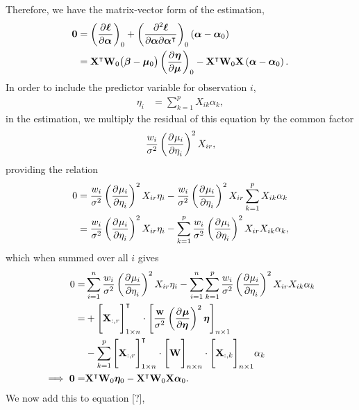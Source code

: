 Therefore, we have the matrix-vector form of the estimation,
\begin{align*}
  \mathbf{0} &= \left( \frac{\partial^{} \bm{\ell}}{\partial \bm{\alpha}^{} } \right)_0 + \left( \frac{\partial^2 \bm{\ell}}{\partial \bm{\alpha} \partial \bm{\alpha}^\intercal} \right)_0 \left( \bm{\alpha} - \bm{\alpha}_0 \right) \\
  &= \mathbf{X}^\intercal \mathbf{W}_0 \big(\bm{\beta} - \bm{\mu}_0\big) \left( \frac{\partial^{} \bm{\eta}}{\partial \bm{\mu}^{} } \right)_0 - \mathbf{X}^\intercal \mathbf{W}_0 \mathbf{X} \left( \bm{\alpha} - \bm{\alpha}_0 \right).
\end{align*}
In order to include the predictor variable for observation $i$,
\begin{align*}
  \eta_i &= \sum_{k=1}^p X_{ik} \alpha_k,
\end{align*}
in the estimation, we multiply the residual of this equation by the common factor
\begin{align*}
  \frac{w_i}{\sigma^2} \left( \frac{\partial^{} \mu_i}{\partial \eta_i^{} } \right)^2 X_{ir},
\end{align*}
providing the relation
\begin{align*}
  0 &= \frac{w_i}{\sigma^2} \left( \frac{\partial^{} \mu_i}{\partial \eta_i^{} } \right)^2 X_{ir} \eta_i - \frac{w_i}{\sigma^2} \left( \frac{\partial^{} \mu_i}{\partial \eta_i^{} } \right)^2 X_{ir} \sum_{k=1}^p X_{ik} \alpha_k \\
  &= \frac{w_i}{\sigma^2} \left( \frac{\partial^{} \mu_i}{\partial \eta_i^{} } \right)^2 X_{ir} \eta_i - \sum_{k=1}^p \frac{w_i}{\sigma^2} \left( \frac{\partial^{} \mu_i}{\partial \eta_i^{} } \right)^2 X_{ir} X_{ik} \alpha_k,
\end{align*}
which when summed over all $i$ gives
\begin{align*}
  0 = &\sum_{i=1}^n \frac{w_i}{\sigma^2} \left( \frac{\partial^{} \mu_i}{\partial \eta_i^{} } \right)^2 X_{ir} \eta_i - \sum_{i=1}^n \sum_{k=1}^p \frac{w_i}{\sigma^2} \left( \frac{\partial^{} \mu_i}{\partial \eta_i^{} } \right)^2 X_{ir} X_{ik} \alpha_k \\
  = &+ \Bigg[ \mathbf{X}_{:,r} \Bigg]_{1 \times n}^\intercal \cdot \Bigg[ \frac{\mathbf{w}}{\sigma^2} \left( \frac{\partial^{} \bm{\mu}}{\partial \bm{\eta}^{} } \right)^2 \bm{\eta} \Bigg]_{n \times 1} \\
    &- \sum_{k=1}^p \Bigg[ \mathbf{X}_{:,r} \Bigg]_{1 \times n}^\intercal \cdot \Bigg[ \mathbf{W} \Bigg]_{n \times n} \cdot \Bigg[ \mathbf{X}_{:,k} \Bigg]_{n \times 1} \alpha_k \\
  \implies \mathbf{0} = &\mathbf{X}^\intercal \mathbf{W}_0 \bm{\eta}_0 - \mathbf{X}^\intercal \mathbf{W}_0 \mathbf{X} \bm{\alpha}_0.
\end{align*}
We now add this to equation [?],
